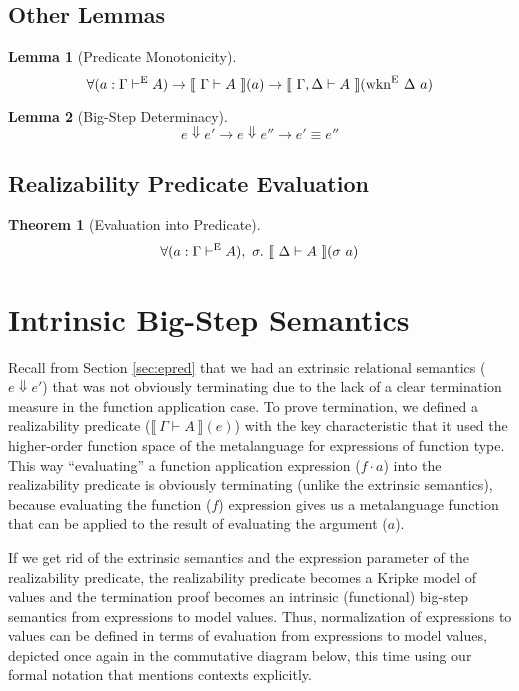 \documentclass[preprint,nonatbib]{sigplanconf}
\numberwithin{subdefin}{defin}
\theoremstyle{definition}
\newtheorem{theorem}{Theorem}
\numberwithin{subtheorem}{theorem}
\numberwithin{sublemma}{theorem}
\numberwithin{corollary}{theorem}
\numberwithin{case}{theorem}
\numberwithin{slcase}{sublemma}
\numberwithin{scase}{subtheorem}
\newtheorem{lemma}{Lemma}
\numberwithin{lcase}{lemma}
\newcommand{\refsec}[1]{Section \ref{sec:#1}}
\def\bigstep{\Downarrow}
\def\marr{\rightarrow}
\def\app{\cdot}
\newcommand{\turn}[1]{\vdash^\con{#1}}
\newcommand{\el}[1]{\llbracket ~ #1 ~ \rrbracket}
\newcommand{\wkne}[1]{\fun{wkn}^\con{E} ~ \Delta ~ #1}
\newcommand{\con}[1]{\textmd{#1}}
\newcommand{\fun}[1]{\textmd{#1}}
\newcommand{\typm}[1]{\el{\Gamma \vdash #1}}
\newcommand{\dtypm}[1]{\el{\Delta \vdash #1}}
\newcommand{\gdtypm}[1]{\el{\Gamma, \Delta \vdash #1}}
\newcommand{\type}[1]{\Gamma \turn{E} #1}
\begin{document}
\subsection{Other Lemmas}

\begin{lemma}[Predicate Monotonicity]
\label{lem:pred:mono}
$$
\forall (a : \type{A}) \marr \typm{A}(a) \marr \gdtypm{A}(\wkne{a})
$$
\end{lemma}

\begin{lemma}[Big-Step Determinacy]
\label{lem:pred:determ}
$$
e \bigstep e' \marr e \bigstep e'' \marr e' \equiv e''
$$
\end{lemma}

\subsection{Realizability Predicate Evaluation}

\begin{theorem}[Evaluation into Predicate]
\label{thm:pred:eval}
$$
\forall (a : \type{A}), ~ \sigma.~ \dtypm{A}(\sigma ~ a)
$$
\end{theorem}

\section{Intrinsic Big-Step Semantics}
\label{sec:emod}

Recall from \refsec{epred} that we had an extrinsic relational
semantics ($e \bigstep e'$) that was not obviously terminating due to
the lack of a clear termination measure in the function application
case. To prove termination, we defined a realizability predicate
($\typm{A}(e)$) with the key characteristic that it used the
higher-order function space of the metalanguage for expressions of
function type. This way ``evaluating'' a function application
expression ($f \app a$) into the realizability predicate is obviously
terminating (unlike the extrinsic semantics), because evaluating 
the function ($f$) expression gives us a metalanguage function that
can be applied to the result of evaluating the argument ($a$).

If we get rid of the extrinsic semantics and the
expression parameter of the realizability predicate, the realizability
predicate becomes a Kripke model of values and the termination proof becomes an
intrinsic (functional) big-step semantics from expressions to model
values. Thus, normalization of expressions to values can be defined in
terms of evaluation from expressions to model values, depicted once
again in the commutative diagram below, this time using our
formal notation that mentions contexts explicitly.
\end{document}
